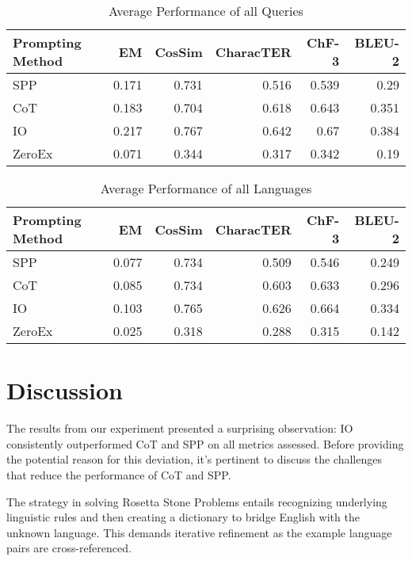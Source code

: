 \documentclass[10pt, a4paper]{article}
\begin{document}
\begin{table*}
\begin{center}
\caption{Average Performance of all Queries}
\begin{tabular}{lrrrrr}
\label{res_LO_que}
 Prompting Method   &    EM &   CosSim &   CharacTER &   ChF-3 &   BLEU-2 \\
\hline
 SPP                & 0.171 &    0.731 &       0.516 &   0.539 &    0.29  \\
 CoT                & 0.183 &    0.704 &       0.618 &   0.643 &    0.351 \\
 IO                 & 0.217 &    0.767 &       0.642 &   0.67  &    0.384 \\
 ZeroEx               & 0.071 &    0.344 &       0.317 &   0.342 &    0.19  \\
\hline
\end{tabular}
\end{center}
\end{table*}

\begin{table*}
\begin{center}
\caption{Average Performance of all Languages}
\begin{tabular}{lrrrrr}
\label{res_LO_pro}
 Prompting Method   &    EM &   CosSim &   CharacTER &   ChF-3 &   BLEU-2 \\
\hline
 SPP                & 0.077 &    0.734 &       0.509 &   0.546 &    0.249 \\
 CoT                & 0.085 &    0.734 &       0.603 &   0.633 &    0.296 \\
 IO                 & 0.103 &    0.765 &       0.626 &   0.664 &    0.334 \\
 ZeroEx               & 0.025 &    0.318 &       0.288 &   0.315 &    0.142 \\
\hline
\end{tabular}
\end{center}
\end{table*}

\section{Discussion}
%
The results from our experiment presented a surprising observation: IO consistently outperformed CoT and SPP on all metrics assessed. Before providing the potential reason for this deviation, it's pertinent to discuss the challenges that reduce the performance of CoT and SPP.

The strategy in solving Rosetta Stone Problems entails recognizing underlying linguistic rules and then creating a dictionary to bridge English with the unknown language. This demands iterative refinement as the example language pairs are cross-referenced.
\end{document}
